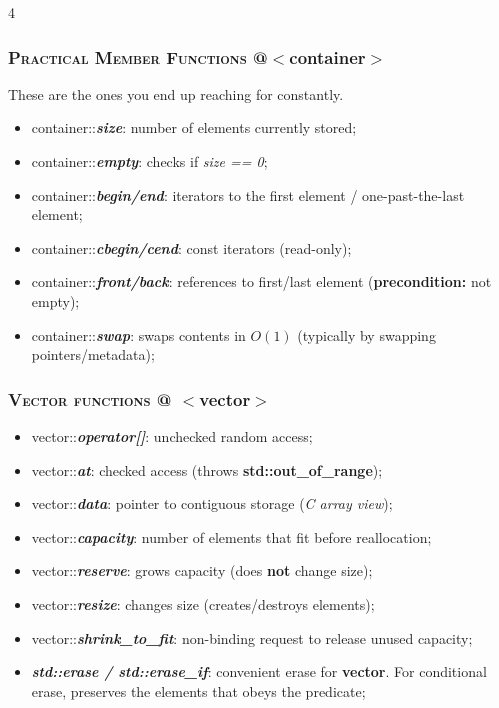 \documentclass[10pt]{article}
\begin{document}
\begin{multicols*}{4}
{\subsubsection*{\textsc{Practical Member Functions}  @$<$container$>$} 
\noindent These are the ones you end up reaching for constantly.

\begin{itemize}[leftmargin=*,topsep=0.25pt]
  \setlength\itemsep{-1.8pt}
  \item container::\emph{\textbf{size}}: number of elements currently stored;
  \item container::\emph{\textbf{empty}}: checks if \emph{size == 0};
  \item container::\emph{\textbf{begin/end}}: iterators to the first element / one-past-the-last element;
  \item container::\emph{\textbf{cbegin/cend}}: const iterators (read-only);
  \item container::\emph{\textbf{front/back}}: references to first/last element (\textbf{precondition:} not empty);
  \item container::\emph{\textbf{swap}}: swaps contents in $O(1)$ (typically by swapping pointers/metadata);
\end{itemize}

\subsubsection*{\textsc{Vector functions} @ $<$vector$>$} 
\begin{itemize}[leftmargin=*,topsep=0.25pt]
  \setlength\itemsep{-1.8pt}
  \item vector::\emph{\textbf{operator[]}}: unchecked random access;
  \item vector::\emph{\textbf{at}}: checked access (throws \textbf{std::out\_of\_range});
  \item vector::\emph{\textbf{data}}: pointer to contiguous storage (\emph{C array view});
  \item vector::\emph{\textbf{capacity}}: number of elements that fit before reallocation;
  \item vector::\emph{\textbf{reserve}}: grows capacity (does \textbf{not} change size);
  \item vector::\emph{\textbf{resize}}: changes size (creates/destroys elements);
  \item vector::\emph{\textbf{shrink\_to\_fit}}: non-binding request to release unused capacity;
  \item \emph{\textbf{std::erase / std::erase\_if}}: convenient erase for \textbf{vector}. For conditional erase, preserves the elements that obeys the predicate;
\end{itemize}

}
\end{multicols*}
\end{document}
